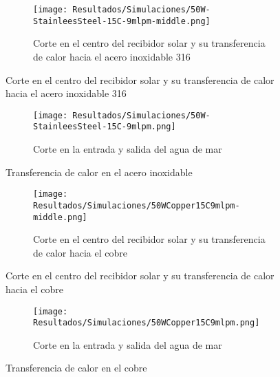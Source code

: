 				\begin{figure}[H]
					\centering
					\begin{subfigure}[t]{\linewidth}
						\centering
						\texttt{[image: Resultados/Simulaciones/50W-StainleesSteel-15C-9mlpm-middle.png]}
						\caption{Corte en el centro del recibidor solar y su transferencia de calor hacia el acero inoxidable 316}
						\label{fig:50W-StainleesSteel-15C-9mlpm-middle}
					\end{subfigure}
				\end{figure}

				\begin{figure}[H]\ContinuedFloat
					\begin{subfigure}[t]{\linewidth}
						\centering
						\texttt{[image: Resultados/Simulaciones/50W-StainleesSteel-15C-9mlpm.png]}
						\caption{Corte en la entrada y salida del agua de mar}
						\label{fig:50W-StainleesSteel-15C-9mlpm}
					\end{subfigure}
					\hfill
					\caption{Transferencia de calor en el acero inoxidable}
					\label{fig:stainless-steel-heat-transfer}
				\end{figure}
				
				\begin{figure}[H]
					\centering
					\begin{subfigure}[t]{\linewidth}
						\centering
						\texttt{[image: Resultados/Simulaciones/50WCopper15C9mlpm-middle.png]}
						\caption{Corte en el centro del recibidor solar y su transferencia de calor hacia el cobre}
						\label{fig:50WCopper15C9mlpm-middle}
					\end{subfigure}
				\end{figure}

				\begin{figure}[H]\ContinuedFloat
					\begin{subfigure}[t]{\linewidth}
						\centering
						\texttt{[image: Resultados/Simulaciones/50WCopper15C9mlpm.png]}
						\caption{Corte en la entrada y salida del agua de mar}
						\label{fig:50WCopper15C9mlpm}
					\end{subfigure}
					\hfill
					\caption{Transferencia de calor en el cobre}
					\label{fig:copper-heat-transfer}
				\end{figure}
				
